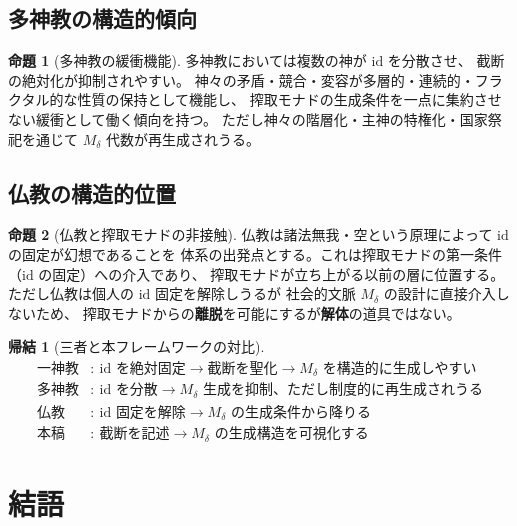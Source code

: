 \documentclass[11pt,a4paper]{ltjsarticle}
\newcommand{\Mdelta}{M_\delta}
\theoremstyle{definition}
\newtheorem{proposition}{命題}[section]
\newtheorem{corollary}{帰結}[section]
\begin{document}
\subsection{多神教の構造的傾向}

\begin{proposition}[多神教の緩衝機能]
多神教においては複数の神が $\mathrm{id}$ を分散させ、
截断の絶対化が抑制されやすい。
神々の矛盾・競合・変容が多層的・連続的・フラクタル的な性質の保持として機能し、
搾取モナドの生成条件を一点に集約させない緩衝として働く傾向を持つ。
ただし神々の階層化・主神の特権化・国家祭祀を通じて
$\Mdelta$ 代数が再生成されうる。
\end{proposition}

\subsection{仏教の構造的位置}

\begin{proposition}[仏教と搾取モナドの非接触]
仏教は諸法無我・空という原理によって $\mathrm{id}$ の固定が幻想であることを
体系の出発点とする。これは搾取モナドの第一条件（$\mathrm{id}$ の固定）への介入であり、
搾取モナドが立ち上がる以前の層に位置する。
ただし仏教は個人の $\mathrm{id}$ 固定を解除しうるが
社会的文脈 $\Mdelta$ の設計に直接介入しないため、
搾取モナドからの\textbf{離脱}を可能にするが\textbf{解体}の道具ではない。
\end{proposition}

\begin{corollary}[三者と本フレームワークの対比]
\begin{align}
\text{一神教} &:\ \mathrm{id}\text{ を絶対固定}
  \to \text{截断を聖化}
  \to \Mdelta\text{ を構造的に生成しやすい}\\
\text{多神教} &:\ \mathrm{id}\text{ を分散}
  \to \Mdelta\text{ 生成を抑制、ただし制度的に再生成されうる}\\
\text{仏教}   &:\ \mathrm{id}\text{ 固定を解除}
  \to \Mdelta\text{ の生成条件から降りる}\\
\text{本稿}   &:\ \text{截断を記述}
  \to \Mdelta\text{ の生成構造を可視化する}
\end{align}
\end{corollary}

\section{結語}
\end{document}
